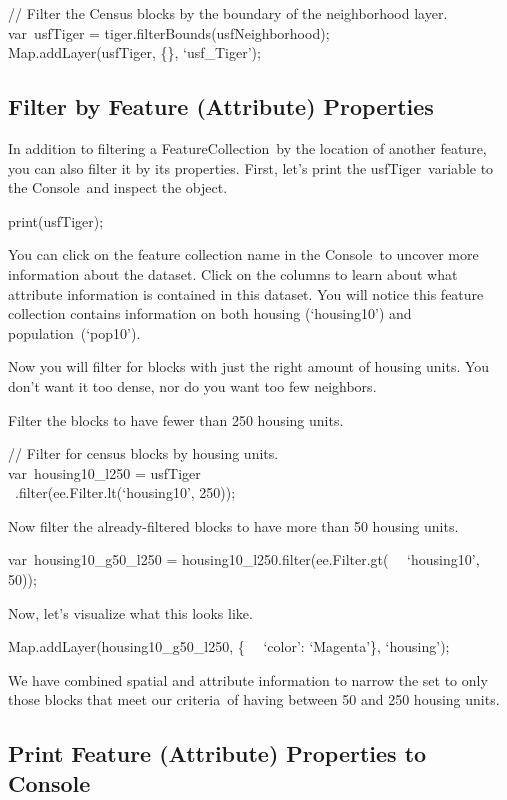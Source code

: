 \documentclass[
  letterpaper,
  DIV=11,
  numbers=noendperiod]{scrreprt}
\begin{document}
// Filter the Census blocks by the boundary of the neighborhood layer.\\
var~usfTiger = tiger.filterBounds(usfNeighborhood);\\
Map.addLayer(usfTiger, \{\}, `usf\_Tiger');

\hypertarget{filter-by-feature-attribute-properties}{%
\subsection{Filter by Feature (Attribute)
Properties}\label{filter-by-feature-attribute-properties}}

In addition to filtering a FeatureCollection~by the location of another
feature, you can also filter it by its properties. First, let's print
the usfTiger~variable to the Console~and inspect the object.

print(usfTiger);

You can click on the feature collection name in the Console~to uncover
more information about the dataset. Click on the columns to learn about
what attribute information is contained in this dataset. You will notice
this feature collection contains information on both housing
(`housing10') and population~(`pop10').

Now you will filter for blocks with just the right amount of housing
units. You don't want it too dense, nor do you want too few neighbors.

Filter the blocks to have fewer than 250 housing units.

// Filter for census blocks by housing units.\\
var~housing10\_l250 = usfTiger\\
\hspace*{0.333em} ~.filter(ee.Filter.lt(`housing10', 250));

Now filter the already-filtered blocks to have more than 50 housing
units.

var~housing10\_g50\_l250 = housing10\_l250.filter(ee.Filter.gt(~
~`housing10', 50));

Now, let's visualize what this looks like.

Map.addLayer(housing10\_g50\_l250, \{~ ~`color': `Magenta'\},
`housing');

We have combined spatial and attribute information to narrow the set to
only those blocks that meet our criteria~of having between 50 and 250
housing units.

\hypertarget{print-feature-attribute-properties-to-console}{%
\subsection{Print Feature (Attribute) Properties to
Console}\label{print-feature-attribute-properties-to-console}}
\end{document}

